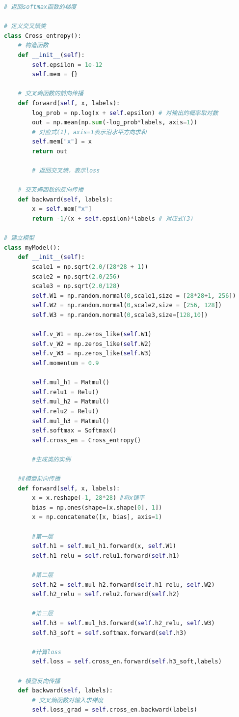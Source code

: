 \begin{lstlisting}[language=python, caption=代码实现]
        # 返回softmax函数的梯度

# 定义交叉熵类
class Cross_entropy():
    # 构造函数
    def __init__(self):
        self.epsilon = 1e-12
        self.mem = {}

    # 交叉熵函数的前向传播
    def forward(self, x, labels):
        log_prob = np.log(x + self.epsilon) # 对输出的概率取对数
        out = np.mean(np.sum(-log_prob*labels, axis=1))
        # 对应式(1)，axis=1表示沿水平方向求和
        self.mem["x"] = x
        return out

        # 返回交叉熵，表示loss

    # 交叉熵函数的反向传播
    def backward(self, labels):
        x = self.mem["x"]
        return -1/(x + self.epsilon)*labels # 对应式(3)

# 建立模型
class myModel():
    def __init__(self):
        scale1 = np.sqrt(2.0/(28*28 + 1))
        scale2 = np.sqrt(2.0/256)
        scale3 = np.sqrt(2.0/128)
        self.W1 = np.random.normal(0,scale1,size = [28*28+1, 256])
        self.W2 = np.random.normal(0,scale2,size = [256, 128])
        self.W3 = np.random.normal(0,scale3,size=[128,10])

        self.v_W1 = np.zeros_like(self.W1)
        self.v_W2 = np.zeros_like(self.W2)
        self.v_W3 = np.zeros_like(self.W3)
        self.momentum = 0.9

        self.mul_h1 = Matmul()
        self.relu1 = Relu()
        self.mul_h2 = Matmul()
        self.relu2 = Relu()
        self.mul_h3 = Matmul()
        self.softmax = Softmax()
        self.cross_en = Cross_entropy()

        #生成类的实例

    ##模型前向传播
    def forward(self, x, labels):
        x = x.reshape(-1, 28*28) #将x铺平
        bias = np.ones(shape=[x.shape[0], 1])
        x = np.concatenate([x, bias], axis=1)

        #第一层
        self.h1 = self.mul_h1.forward(x, self.W1)
        self.h1_relu = self.relu1.forward(self.h1)

        #第二层
        self.h2 = self.mul_h2.forward(self.h1_relu, self.W2)
        self.h2_relu = self.relu2.forward(self.h2)

        #第三层
        self.h3 = self.mul_h3.forward(self.h2_relu, self.W3)
        self.h3_soft = self.softmax.forward(self.h3)

        #计算loss
        self.loss = self.cross_en.forward(self.h3_soft,labels)

    # 模型反向传播
    def backward(self, labels):
        # 交叉熵函数对输入求梯度
        self.loss_grad = self.cross_en.backward(labels)


\end{lstlisting}
